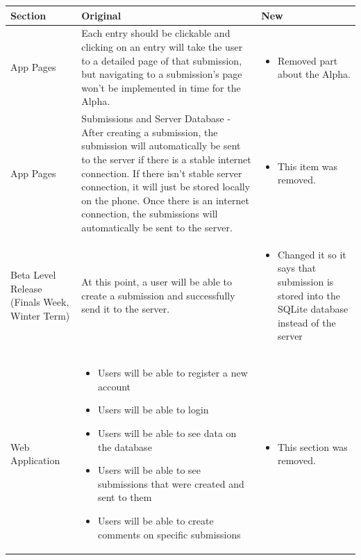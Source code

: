 \documentclass[onecolumn, draftclsnofoot, article, 10pt, compsoc]{IEEEtran}
\begin{document}
\clearpage

\begin{table}
\begin{tabularx}{\textwidth}{|>{\setlength\hsize{.8\hsize}\setlength\linewidth{\hsize}}X|>{\setlength\hsize{1.1\hsize}\setlength\linewidth{\hsize}}X|>{\setlength\hsize{1.1\hsize}\setlength\linewidth{\hsize}}X|}
\hline
Section & Original & New \\
\hline

App Pages
&
 Each entry should be clickable and clicking on an entry will take the user to a detailed page of that submission, but  navigating to a submission's page won't be implemented in time for the Alpha.
&
\begin{itemize}
    \item Removed part about the Alpha.
\end{itemize}
\\

\hline
App Pages 
&
 Submissions and Server Database - After creating a submission, the submission will automatically be sent to the server if there is a stable internet connection. If there isn't stable server connection, it will just be stored locally on the phone. Once there is an internet connection, the submissions will automatically be sent to the server.
&
\begin{itemize}
    \item This item was removed.
\end{itemize}
\\

\hline
Beta Level Release (Finals Week, Winter Term)
&
At this point, a user will be able to create a submission and successfully send it to the server.
&
\begin{itemize}
    \item Changed it so it says that submission is stored into the SQLite database instead of the server
\end{itemize}
\\

\hline
Web Application
&
\begin{itemize}
\item Users will be able to register a new account
\item Users will be able to login
\item Users will be able to see data on the database
\item Users will be able to see submissions that were created and sent to them
\item Users will be able to create comments on specific submissions
\end{itemize}  
&
\begin{itemize}
    \item This section was removed.
\end{itemize}
\\
\hline


\end{tabularx}
\end{table}
\end{document}

